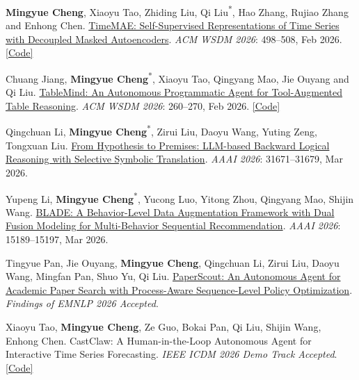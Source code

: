\documentclass[UTF8,fontset=fandol,scheme=plain,11pt,a4paper]{ctexart}
\newcommand{\pubentry}[1]{\item \begin{minipage}[t]{\linewidth}#1\end{minipage}}
\begin{document}
\begin{publist}[start=4]
\pubentry{\textbf{Mingyue Cheng}, Xiaoyu Tao, Zhiding Liu, Qi Liu\textsuperscript{*}, Hao Zhang, Rujiao Zhang and Enhong Chen. \href{https://arxiv.org/abs/2303.00320}{TimeMAE: Self-Supervised Representations of Time Series with Decoupled Masked Autoencoders}. \emph{ACM WSDM 2026}: 498--508, Feb 2026. \href{https://github.com/Mingyue-Cheng/TimeMAE}{[Code]}}

\pubentry{Chuang Jiang, \textbf{Mingyue Cheng}\textsuperscript{*}, Xiaoyu Tao, Qingyang Mao, Jie Ouyang and Qi Liu. \href{https://arxiv.org/pdf/2509.06278}{TableMind: An Autonomous Programmatic Agent for Tool-Augmented Table Reasoning}. \emph{ACM WSDM 2026}: 260--270, Feb 2026. \href{https://github.com/lennendd/TableMind-Repo}{[Code]}}

\pubentry{Qingchuan Li, \textbf{Mingyue Cheng}\textsuperscript{*}, Zirui Liu, Daoyu Wang, Yuting Zeng, Tongxuan Liu. \href{https://ojs.aaai.org/index.php/AAAI/article/download/40434/44395}{From Hypothesis to Premises: LLM-based Backward Logical Reasoning with Selective Symbolic Translation}. \emph{AAAI 2026}: 31671--31679, Mar 2026.}

\pubentry{Yupeng Li, \textbf{Mingyue Cheng}\textsuperscript{*}, Yucong Luo, Yitong Zhou, Qingyang Mao, Shijin Wang. \href{https://ojs.aaai.org/index.php/AAAI/article/download/38543/42505}{BLADE: A Behavior-Level Data Augmentation Framework with Dual Fusion Modeling for Multi-Behavior Sequential Recommendation}. \emph{AAAI 2026}: 15189--15197, Mar 2026.}

\pubentry{Tingyue Pan, Jie Ouyang, \textbf{Mingyue Cheng}, Qingchuan Li, Zirui Liu, Daoyu Wang, Mingfan Pan, Shuo Yu, Qi Liu. \href{https://arxiv.org/pdf/2601.10029.pdf}{PaperScout: An Autonomous Agent for Academic Paper Search with Process-Aware Sequence-Level Policy Optimization}. \emph{Findings of EMNLP 2026 Accepted}.}

\pubentry{Xiaoyu Tao, \textbf{Mingyue Cheng}, Ze Guo, Bokai Pan, Qi Liu, Shijin Wang, Enhong Chen. CastClaw: A Human-in-the-Loop Autonomous Agent for Interactive Time Series Forecasting. \emph{IEEE ICDM 2026 Demo Track Accepted}. \href{https://github.com/ustc-time-series/CastClaw}{[Code]}}


\end{publist}
\end{document}
